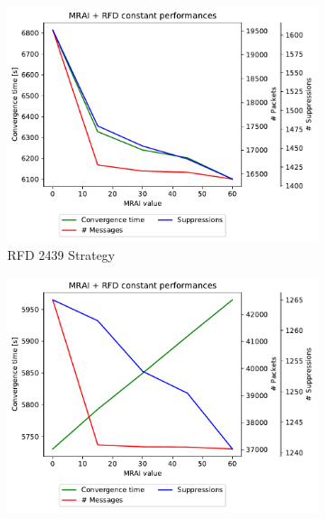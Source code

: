 \begin{figure}[h]
     \centering
     \begin{subfigure}[b]{0.325\textwidth}
         \centering
         \includegraphics[width=\textwidth]{images/RFD/miceVSelephants/MultiMRAI/mice/cisco_1000_RFD_2439-constant_mrai_rfd_evolution.pdf}
         \caption{RFD 2439 Strategy}
         \label{fig:1000_2439RFD_multiMRAI_mice}
     \end{subfigure}
     \hfill
     \begin{subfigure}[b]{0.325\textwidth}
         \centering
         \includegraphics[width=\textwidth]{images/RFD/miceVSelephants/MultiMRAI/mice/cisco_1000_RFD_7196_aggressive-constant_mrai_rfd_evolution.pdf}

\end{subfigure}
\end{figure}
